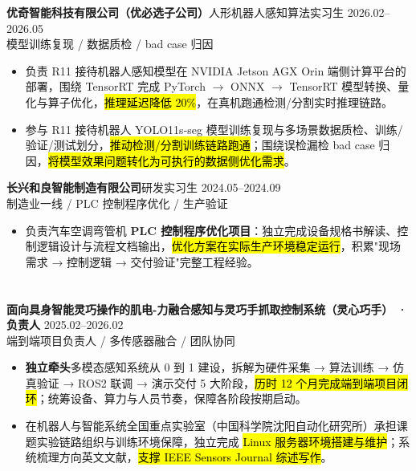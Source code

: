 \vspace{0.30em}
{\small\textbf{优奇智能科技有限公司（优必选子公司）}}\quad 人形机器人感知算法实习生 \hfill {2026.02--2026.05} \\
{\scriptsize\color{WHU_Blue} 模型训练复现 / 数据质检 / bad case 归因}
\begin{itemize}
    \item 负责 R11 接待机器人感知模型在 NVIDIA Jetson AGX Orin 端侧计算平台的部署，围绕 TensorRT 完成 PyTorch $\rightarrow$ ONNX $\rightarrow$ TensorRT 模型转换、量化与算子优化，\hl{推理延迟降低 20\%}，在真机跑通检测/分割实时推理链路。
    \item 参与 R11 接待机器人 YOLO11s-seg 模型训练复现与多场景数据质检、训练/验证/测试划分，\hl{推动检测/分割训练链路跑通}；围绕误检漏检 bad case 归因，\hl{将模型效果问题转化为可执行的数据侧优化需求}。
\end{itemize}

\vspace{0.30em}
{\small\textbf{长兴和良智能制造有限公司}}\quad 研发实习生 \hfill {2024.05--2024.09} \\
{\scriptsize\color{WHU_Blue} 制造业一线 / PLC 控制程序优化 / 生产验证}
\begin{itemize}
    \item 负责汽车空调弯管机 \textbf{PLC 控制程序优化项目}：独立完成设备规格书解读、控制逻辑设计与流程文档输出，\hl{优化方案在实际生产环境稳定运行}，积累"现场需求 → 控制逻辑 → 交付验证"完整工程经验。
\end{itemize}

\section[科研与项目经历]{}
{\small\textbf{面向具身智能灵巧操作的肌电-力融合感知与灵巧手抓取控制系统（灵心巧手） · 负责人}} \hfill {2025.02--2026.02} \\
{\scriptsize\color{WHU_Blue} 端到端项目负责人 / 多传感器融合 / 团队协同}
\begin{itemize}
    \item \textbf{独立牵头}多模态感知系统从 0 到 1 建设，拆解为硬件采集 → 算法训练 → 仿真验证 → ROS2 联调 → 演示交付 5 大阶段，\hl{历时 12 个月完成端到端项目闭环}；统筹设备、算力与人员节奏，保障各阶段按期启动。
    \item 在机器人与智能系统全国重点实验室（中国科学院沈阳自动化研究所）承担课题实验链路组织与训练环境保障，独立完成 \hl{Linux 服务器环境搭建与维护}；系统梳理方向英文文献，\hl{支撑 IEEE Sensors Journal 综述写作}。
\end{itemize}


